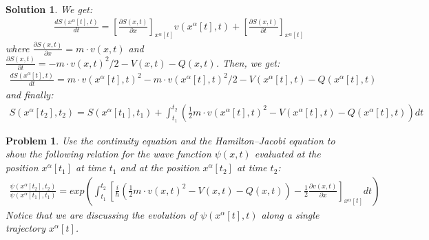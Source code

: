 \documentclass[nofootinbib, secnumarabic, amsmath, nobibnotes,10pt,aps,pra]{revtex4-1}
\newtheorem{problem}{Problem}
\newtheorem{solution}{Solution}
\begin{document}
\begin{solution}
We get: 
\begin{eqnarray}
\frac {dS(x^{\alpha}[t],t)}{dt}=\left[\frac {\partial S(x,t)}{\partial x}\right]_{x^{\alpha}[t]}v(x^{\alpha}[t],t)+\left[\frac {\partial S(x,t)}{\partial t}\right]_{x^{\alpha}[t]}\nonumber
\end{eqnarray}
where $\frac {\partial S(x,t)}{\partial x}=m\cdot v(x,t)$ and $\frac {\partial S(x,t)}{\partial t}=-m\cdot v(x,t)^2/2-V(x,t)-Q(x,t)$. Then, we get:
\begin{eqnarray}
\frac {dS(x^{\alpha}[t],t)}{dt}=m \cdot v(x^{\alpha}[t],t)^2-m\cdot v(x^{\alpha}[t],t)^2/2-V(x^{\alpha}[t],t)-Q(x^{\alpha}[t],t)\nonumber
\end{eqnarray}
and finally:
\begin{eqnarray}
S(x^{\alpha}[t_2],t_2)=S(x^{\alpha}[t_1],t_1) +\int_{t_1}^{t_2}\left( \frac{1}{2}m\cdot v(x^{\alpha}[t],t)^2 -V(x^{\alpha}[t],t)-Q(x^{\alpha}[t],t)\right)dt \nonumber
\end{eqnarray}
\end{solution}

\begin{problem} \label{om.P11}
Use the continuity equation and the Hamilton--Jacobi equation to show the following relation for the wave function $\psi(x,t)$ evaluated at the position $x^{\alpha}[t_1]$ at time $t_1$ and at the position $x^{\alpha}[t_2]$ at time $t_2$:
\begin{eqnarray}
\frac{\psi(x^{\alpha}[t_2],t_2)}{\psi(x^{\alpha}[t_1],t_1)}=exp\left( \int_{t_1}^{t_2}\left[ \frac{i}{\hbar} \left(\frac{1}{2}m\cdot v(x,t)^2 -V(x,t)-Q(x,t)\right)-\frac{1}{2}\frac{\partial v(x,t)}{\partial x}\right]_{x^{\alpha}[t]} dt \right) \nonumber
\end{eqnarray}
Notice that we are discussing the evolution of $\psi(x^{\alpha}[t],t)$ along a single trajectory  $x^{\alpha}[t]$.
\end{problem}
\end{document}
